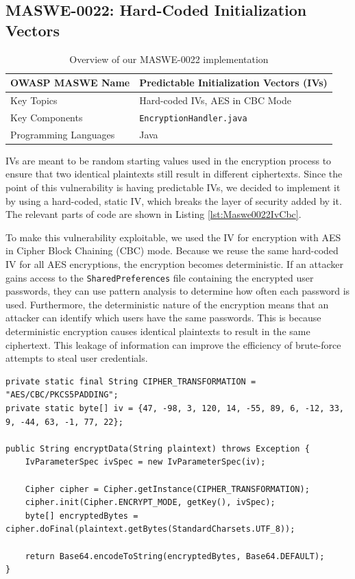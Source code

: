 \subsection{MASWE-0022: Hard-Coded Initialization Vectors}

\begin{table}[H]
\centering
\renewcommand{\arraystretch}{1.3}
\begin{tabular}{p{5cm} p{8cm}} 
\toprule
OWASP MASWE Name & Predictable Initialization Vectors (IVs) \\ 
\midrule
Key Topics & Hard-coded IVs, AES in CBC Mode \\
Key Components & \texttt{EncryptionHandler.java} \\
Programming Languages & Java \\ 
\bottomrule
\end{tabular}
\caption{Overview of our MASWE-0022 implementation}
\label{tab:maswe-0022}
\end{table}

IVs are meant to be random starting values used in the encryption process to ensure that two identical plaintexts still result in different ciphertexts. Since the point of this vulnerability is having predictable IVs, we decided to implement it by using a hard-coded, static IV, which breaks the layer of security added by it. The relevant parts of code are shown in Listing \ref{lst:Maswe0022IvCbc}. 

To make this vulnerability exploitable, we used the IV for encryption with AES in Cipher Block Chaining (CBC) \cite{aes_cbc} mode. Because we reuse the same hard-coded IV for all AES encryptions, the encryption becomes deterministic. If an attacker gains access to the \texttt{SharedPreferences} file containing the encrypted user passwords, they can use pattern analysis to determine how often each password is used. Furthermore, the deterministic nature of the encryption means that an attacker can identify which users have the same passwords. This is because deterministic encryption causes identical plaintexts to result in the same ciphertext. This leakage of information can improve the efficiency of brute-force attempts to steal user credentials.

\begin{lstlisting}[style=JavaStyle, float=tbh, captionpos=b, caption={AES in CBC mode with a static IV}, label={lst:Maswe0022IvCbc}]
private static final String CIPHER_TRANSFORMATION = "AES/CBC/PKCS5PADDING";
private static byte[] iv = {47, -98, 3, 120, 14, -55, 89, 6, -12, 33, 9, -44, 63, -1, 77, 22};

public String encryptData(String plaintext) throws Exception {
    IvParameterSpec ivSpec = new IvParameterSpec(iv);

    Cipher cipher = Cipher.getInstance(CIPHER_TRANSFORMATION);
    cipher.init(Cipher.ENCRYPT_MODE, getKey(), ivSpec);
    byte[] encryptedBytes = cipher.doFinal(plaintext.getBytes(StandardCharsets.UTF_8));

    return Base64.encodeToString(encryptedBytes, Base64.DEFAULT);
}
\end{lstlisting}


